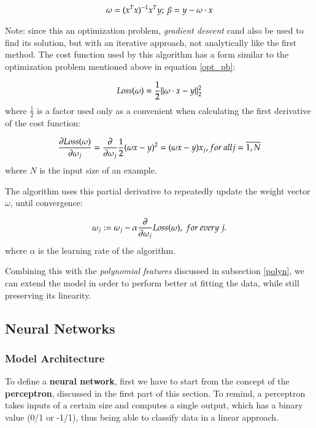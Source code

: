 \begin{equation}
\centering
\omega = (x^{T} x)^{-1} x^{T} y ;\ 
\beta = y - \omega \cdot x
\end{equation}

Note: since this an optimization problem, {\it gradient descent} cand also be 
used to find its solution, but with an iterative approach, not analytically like 
the first method. The cost function used by this algorithm has a form 
similar to the optimization problem mentioned above in equation \ref{opt_pb}: 

\begin{equation}
\centering
Loss(\omega) = \frac{1}{2}\| \omega \cdot x - y \|_{2}^{2}
\label{sq_loss}
\end{equation}
where $\frac{1}{2}$ is a factor used only as a convenient when calculating 
the first derivative of the cost function:

\begin{equation}
\centering
\frac{\partial Loss(\omega)}{\partial \omega_{j}} = \frac{\partial}{\partial \omega_{j}}\frac{1}{2}
(\omega x - y)^{2} = (\omega x - y) x_{j}, for\ all j = \overline{1, N}
\end{equation}
where $N$ is the input size of an example.

The algorithm uses this partial derivative to repeatedly update the weight vector 
$\omega$, until convergence:

\begin{equation}
\centering
\omega_{j} := \omega_{j} - \alpha \frac{\partial}{\partial \omega_{j}}Loss(\omega),
\ for\ every\ j.
\end{equation}
where $\alpha$ is the learning rate of the algorithm.

Combining this with the {\it polynomial features} discussed in subsection 
\ref{polyn}, we can extend the model in order to perform better at fitting the 
data, while still preserving its linearity.

\subsection{Neural Networks}

\subsubsection{Model Architecture}

To define a {\bf neural network}, first we have to start from the concept of 
the {\bf perceptron}, discussed in the first part of this section. To remind, 
a perceptron takes inputs of a certain size and computes a single output, 
which has a binary value (0/1 or -1/1), thus being able to classify data 
in a linear approach. 

